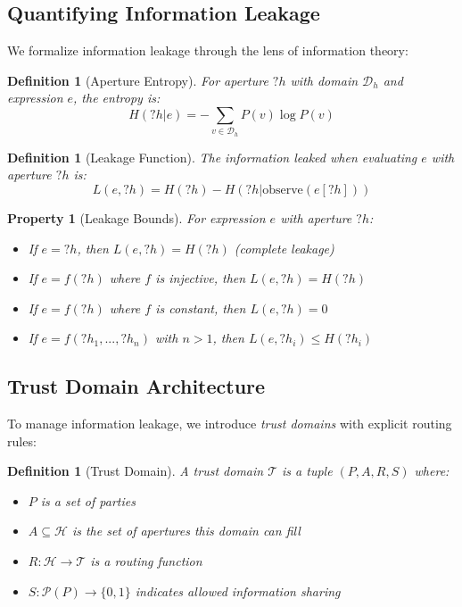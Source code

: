 \documentclass[12pt]{article}
\newtheorem{definition}[theorem]{Definition}
\newtheorem{property}[theorem]{Property}
\begin{document}
\subsection{Quantifying Information Leakage}

We formalize information leakage through the lens of information theory:

\begin{definition}[Aperture Entropy]
For aperture $?h$ with domain $\mathcal{D}_h$ and expression $e$, the entropy is:
$$H(?h | e) = -\sum_{v \in \mathcal{D}_h} P(v) \log P(v)$$
\end{definition}

\begin{definition}[Leakage Function]
The information leaked when evaluating $e$ with aperture $?h$ is:
$$L(e, ?h) = H(?h) - H(?h | \text{observe}(e[?h]))$$
\end{definition}

\begin{property}[Leakage Bounds]
For expression $e$ with aperture $?h$:
\begin{itemize}
    \item If $e = ?h$, then $L(e, ?h) = H(?h)$ (complete leakage)
    \item If $e = f(?h)$ where $f$ is injective, then $L(e, ?h) = H(?h)$
    \item If $e = f(?h)$ where $f$ is constant, then $L(e, ?h) = 0$
    \item If $e = f(?h_1, ..., ?h_n)$ with $n > 1$, then $L(e, ?h_i) \leq H(?h_i)$
\end{itemize}
\end{property}

\subsection{Trust Domain Architecture}

To manage information leakage, we introduce \textit{trust domains} with explicit routing rules:

\begin{definition}[Trust Domain]
A trust domain $\mathcal{T}$ is a tuple $(P, A, R, S)$ where:
\begin{itemize}
    \item $P$ is a set of parties
    \item $A \subseteq \mathcal{H}$ is the set of apertures this domain can fill
    \item $R : \mathcal{H} \rightarrow \mathcal{T}$ is a routing function
    \item $S : \mathcal{P}(P) \rightarrow \{0,1\}$ indicates allowed information sharing
\end{itemize}
\end{definition}
\end{document}
